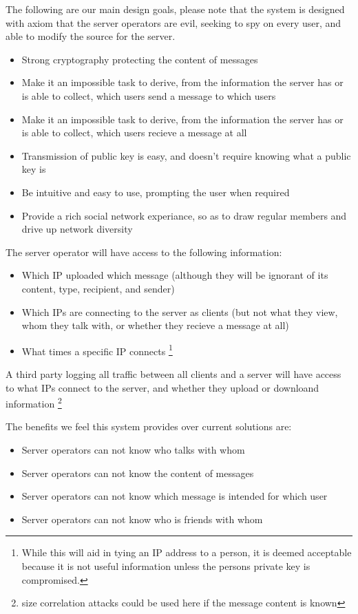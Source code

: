The following are our main design goals, please note that the system is designed
with axiom that the server operators are evil, seeking to spy on every user, and
able to modify the source for the server.
\begin{itemize}
\item Strong cryptography protecting the content of messages
\item Make it an impossible task to derive, from the information the server has
      or is able to collect, which users send a message to which users
\item Make it an impossible task to derive, from the information the server has
      or is able to collect, which users recieve a message at all
\item Transmission of public key is easy, and doesn't require knowing what a
      public key is
\item Be intuitive and easy to use, prompting the user when required
\item Provide a rich social network experiance, so as to draw regular members
      and drive up network diversity
\end{itemize}

The server operator will have access to the following information:
\begin{itemize}
\item Which IP uploaded which message (although they will be ignorant of its
content, type, recipient, and sender)
\item Which IPs are connecting to the server as clients (but not what they view,
whom they talk with, or whether they recieve a message at all)
\item What times a specific IP connects \footnote {While this will aid in tying
an IP address to a person, it is deemed acceptable because it is not useful
information unless the persons private key is compromised.}
\end{itemize}

A third party logging all traffic between all clients and a server will have
access to  what IPs connect to the
server, and whether they upload or downloand information \footnote{size
correlation attacks could be used here if the message content is known}

The benefits we feel this system provides over current solutions are:
\begin{itemize}
\item Server operators can not know who talks with whom
\item Server operators can not know the content of messages
\item Server operators can not know which message is intended for which user
\item Server operators can not know who is friends with whom
\end{itemize}

